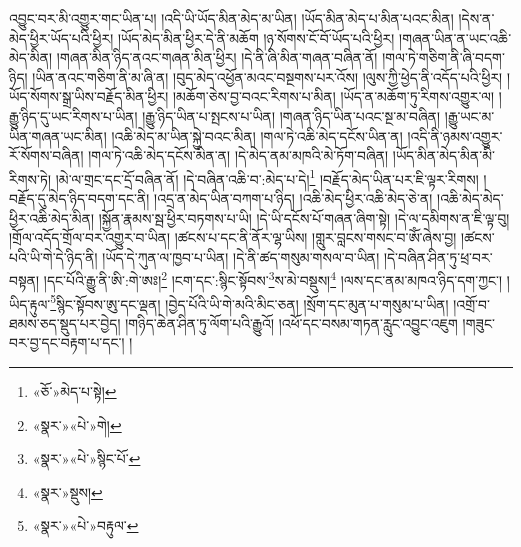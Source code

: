 འབྱུང་བར་མི་འགྱུར་གང་ཡིན་པ། །འདི་ཡི་ཡོད་མིན་མེད་མ་ཡིན། །ཡོད་མིན་མེད་པ་མིན་པའང་མིན། །དེས་ན་མེད་ཕྱིར་ཡོད་པའི་ཕྱིར། །ཡོད་མེད་མིན་ཕྱིར་དེ་ནི་མཆོག །ཉ་སོགས་ངོ་བོ་ཡོད་པའི་ཕྱིར། །གཞན་ཡིན་ན་ཡང་འཆི་མེད་མིན། །གཞན་མིན་ཉིད་ནའང་གཞན་མིན་ཕྱིར། །དེ་ནི་ཞི་མིན་གཞན་བཞིན་ནོ། །གལ་ཏེ་གཅིག་ནི་ཞི་བདག་ཉིད། །ཡིན་ནའང་གཅིག་ནི་མ་ཞི་ན། །བུད་མེད་འཕྱོན་མའང་བསྔགས་པར་འོས། །ལུས་ཀྱི་ཕྱེད་ནི་འདོད་པའི་ཕྱིར། །ཡོད་སོགས་སྒྲ་ཡིས་བརྗོད་མིན་ཕྱིར། །མཆོག་ཅེས་བྱ་བའང་རིགས་པ་མིན། །ཡོད་ན་མཆོག་ཏུ་རིགས་འགྱུར་ལ། །རྒྱུ་ཉིད་དུ་ཡང་རིགས་པ་ཡིན། །རྒྱུ་ཉིད་ཡིན་པ་སྤངས་པ་ཡིན། །གཞན་ཉིད་ཡིན་པའང་སྔ་མ་བཞིན། །རྒྱུ་ཡང་མ་ཡིན་གཞན་ཡང་མིན། །འཆི་མེད་མ་ཡིན་སྐྱེ་བའང་མིན། །གལ་ཏེ་འཆི་མེད་དངོས་ཡིན་ན། །འདི་ནི་ཉམས་འགྱུར་རོ་སོགས་བཞིན། །གལ་ཏེ་འཆི་མེད་དངོས་མིན་ན། །དེ་མེད་ནམ་མཁའི་མེ་ཏོག་བཞིན། །ཡོད་མིན་མེད་མིན་མི་རིགས་ཏེ། །མེ་ལ་གྲང་དང་དྲོ་བཞིན་ནོ། །དེ་བཞིན་འཆི་བ་:མེད་པ་དེ།\footnote{«ཅོ་»མེད་པ་སྟེ།} །བརྗོད་མེད་ཡིན་པར་ཇི་ལྟར་རིགས། །བརྗོད་དུ་མེད་ཉིད་བདག་དང་ནི། །འདྲ་ན་མེད་ཡིན་བཀག་པ་ཉིད། །འཆི་མེད་ཕྱིར་འཆི་མེད་ཅེ་ན། །འཆི་མེད་མེད་ཕྱིར་འཆི་མེད་མིན། །སྐྱོན་རྣམས་སྦ་ཕྱིར་བཏགས་པ་ཡི། །དེ་ཡི་དངོས་པོ་གཞན་ཞིག་སྟེ། །དེ་ལ་དམིགས་ན་ཇི་ལྟ་བུ། །གྲོལ་འདོད་གྲོལ་བར་འགྱུར་བ་ཡིན། །ཚངས་པ་དང་ནི་ནོར་ལྷ་ཡིས། །གླུར་བླངས་གསང་བ་ཨོཾ་ཞེས་བྱ། །ཚངས་པའི་ཡི་གེ་དེ་ཉིད་ནི། །ཡོད་དེ་ཀུན་ལ་ཁྱབ་པ་ཡིན། །དེ་ནི་ཚད་གསུམ་གསལ་བ་ཡིན། །དེ་བཞིན་ཤིན་ཏུ་ཕྲ་བར་བསྟན། །དང་པོའི་རྒྱུ་ནི་ཨི་:གེ་ཨཿ།\footnote{«སྣར་»«པེ་»གེ།} །ངག་དང་:སྙིང་སྟོབས་\footnote{«སྣར་»«པེ་»སྙིང་པོ་}ས་མེ་བསྡུས།\footnote{«སྣར་»སྡུས།} །ལས་དང་ནམ་མཁའ་ཉིད་དག་ཀྱང་། །ཡིད་རྟུལ་\footnote{«སྣར་»«པེ་»བརྟུལ་}སྙིང་སྟོབས་ཨུ་དང་ལྡན། །བྱེད་པོའི་ཡི་གེ་མའི་མིང་ཅན། །སྲོག་དང་མུན་པ་གསུམ་པ་ཡིན། །འགྲོ་བ་ཐམས་ཅད་སྡུད་པར་བྱེད། །གཉིད་ཆེན་ཤིན་ཏུ་ལོག་པའི་རྒྱུའོ། །འཕོ་དང་བསམ་གཏན་རླུང་འབྱུང་འཇུག །གཟུང་བར་བྱ་དང་བརྟག་པ་དང་། །
